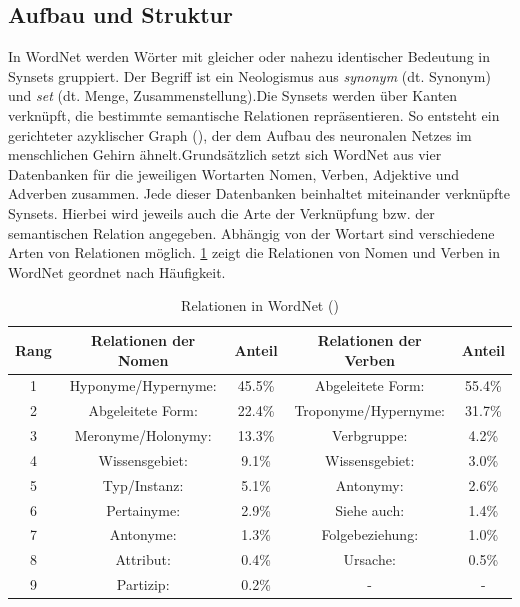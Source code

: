 \subsection{Aufbau und Struktur}

In WordNet werden Wörter mit gleicher oder nahezu identischer Bedeutung in Synsets gruppiert. Der Begriff ist ein Neologismus aus \textit{synonym} (dt. Synonym) und \textit{set} (dt. Menge, Zusammenstellung).Die Synsets werden über Kanten verknüpft, die bestimmte semantische Relationen repräsentieren. So entsteht ein gerichteter azyklischer Graph (\cite[vgl.][12]{OLTRAMANI}), der dem Aufbau des neuronalen Netzes im menschlichen Gehirn ähnelt.Grundsätzlich setzt sich WordNet aus vier Datenbanken für die jeweiligen Wortarten Nomen, Verben, Adjektive und Adverben zusammen. Jede dieser Datenbanken beinhaltet miteinander verknüpfte Synsets. Hierbei wird jeweils auch die Arte der Verknüpfung bzw. der semantischen Relation angegeben. Abhängig von der Wortart sind verschiedene Arten von Relationen möglich. \ref{table:table2} zeigt die Relationen von Nomen und Verben in WordNet geordnet nach Häufigkeit.
\par
\begin{table}[h!]
  \centering
  \begin{tabular}{ccccc} %
    \toprule
     Rang & Relationen der Nomen & Anteil  & Relationen der Verben & Anteil \\
    \midrule
    1 & Hyponyme/Hypernyme: & 45.5\% & Abgeleitete Form:    & 55.4\% \\
    2 & Abgeleitete Form:   & 22.4\% & Troponyme/Hypernyme: & 31.7\% \\
    3 & Meronyme/Holonymy:  & 13.3\% & Verbgruppe:          & 4.2\%  \\
    4 & Wissensgebiet:      & 9.1\%  & Wissensgebiet:       & 3.0\%  \\
    5 & Typ/Instanz: 		& 5.1\%  & Antonymy:			& 2.6\%  \\
    6 & Pertainyme: 		& 2.9\%  & Siehe auch: 		    & 1.4\%  \\
    7 & Antonyme: 			& 1.3\% & Folgebeziehung: 	    & 1.0\%  \\
	8 & Attribut: 			& 0.4\%  & Ursache: 			& 0.5\%  \\
	9 & Partizip: 	        & 0.2\%  & -     	            & -  	 \\
	\bottomrule
  \end{tabular}
  \caption{Relationen in WordNet (\cite[vgl.][9]{MAZIARZ})}
  \label{table:table2}
\end{table}
\par

